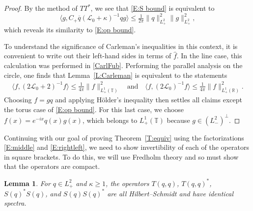 \documentclass{amsart}
\numberwithin{equation}{section}
\newtheorem{lemma}[theorem]{Lemma}
\theoremstyle{definition}
\newcommand{\ka}{\kappa}
\newcommand{\R}{\mathbb{R}}
\newcommand{\T}{\mathbb{T}}
\newcommand{\Lc}{\mathcal{L}}
\newcommand{\qtq}[1]{\quad\text{#1}\quad}
\begin{document}
\begin{proof}
By the method of $TT^*$, we see that \eqref{E:S bound} is equivalent to
\begin{equation}\label{E:S bound'}
\langle g,  C_+ \overline q (\Lc_0+\ka)^{-1} qg\rangle \leq \tfrac{1}{2\pi} \|q\|_{L^2_+}^2 \|g\|_{L^2_+}^2,
\end{equation}
which reveals its similarity to \eqref{E:op bound}.

To understand the significance of Carleman's inequalities in this context, it is convenient to write out their left-hand sides in terms of $\widehat f$.  In the line case, this calculation was performed in \eqref{CarlFub}.  Performing the parallel analysis on the circle, one finds that Lemma~\ref{L:Carleman} is equivalent to the statements 
\begin{align}\label{E:Carleman'}
	\langle f, (2\Lc_0+2)^{-1} f \rangle \leq \tfrac{1}{4\pi} \bigl\| f\bigr\|_{L^1_+(\T)}^2 \qtq{and}
	\langle f, (2\Lc_0)^{-1} f \rangle \leq \tfrac{1}{4\pi} \bigl\| f\bigr\|_{L^1_+(\R)}^2.
\end{align}
Choosing $f=gq$ and applying H\"older's inequality then settles all claims except the torus case of \eqref{E:op bound}.  For this last case, we choose $f(x) = e^{-ix}q(x)g(x)$, which belongs to $L^1_+(\T)$ because $g\in (L^2_-)^\perp$.%
\end{proof}

Continuing with our goal of proving Theorem~\ref{T:equiv} using the factorizations \eqref{E:middle} and \eqref{E:rightleft}, we need to show invertibility of each of the operators in square brackets.  To do this, we will use Fredholm theory and so must show that the operators are compact.

\begin{lemma}\label{L:SST}
For $q\in L^2_+$ and $\kappa\geq 1$, the operators $T(q,q)$, $T(q,q)^*$, $S(q)^*S(q)$, and $S(q)S(q)^*$ are all Hilbert--Schmidt and have identical spectra.
\end{lemma}
\end{document}
